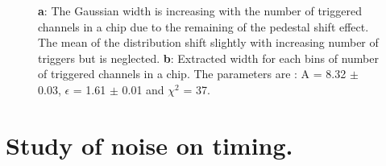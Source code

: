 \documentclass[twoside,a4paper,11pt]{article}
\begin{document}
\begin{appendix}
\begin{figure}[htbp]
	\caption[]{\textbf{a}: The Gaussian width is increasing with the number of triggered channels in a chip due to the remaining of the pedestal shift effect. The mean of the distribution shift slightly with increasing number of triggers but is neglected. \textbf{b}: Extracted width for each bins of number of triggered channels in a chip. The parameters are : A = 8.32 $\pm$ 0.03, $\epsilon$ = 1.61 $\pm$ 0.01 and $\chi^2$ = 37.}
	\label{fig:mc_para}
\end{figure}

\newpage
\section{Study of noise on timing.}
\label{appendix:noise_timing}


\end{appendix}
\end{document}
